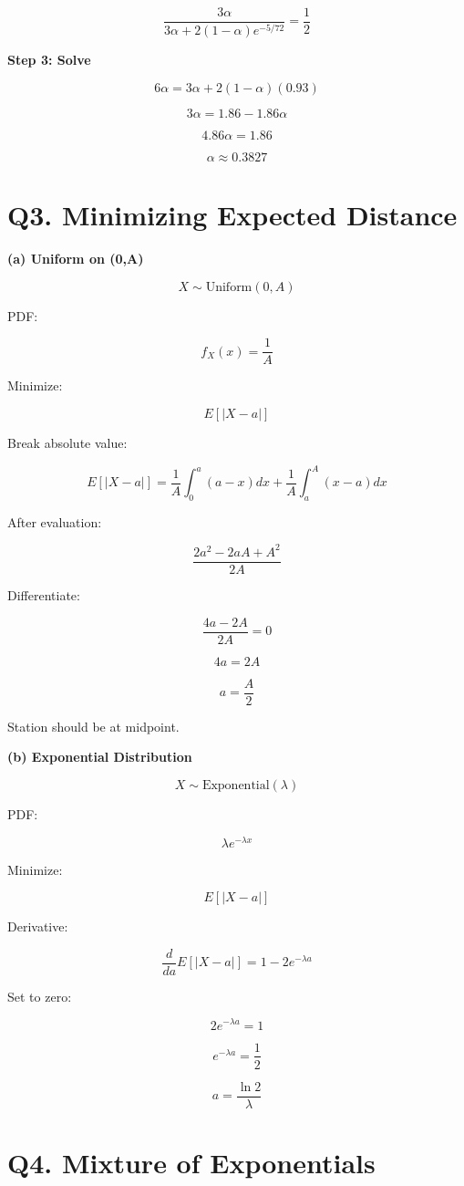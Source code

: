 \documentclass[11pt]{article}
\begin{document}
\[
\frac{3\alpha}{3\alpha+2(1-\alpha)e^{-5/72}}=\frac{1}{2}
\]

\textbf{Step 3: Solve}

\[
6\alpha = 3\alpha + 2(1-\alpha)(0.93)
\]

\[
3\alpha = 1.86 - 1.86\alpha
\]

\[
4.86\alpha = 1.86
\]

\[
\alpha \approx 0.3827
\]


\section*{Q3. Minimizing Expected Distance}

\textbf{(a) Uniform on (0,A)}

\[
X \sim \text{Uniform}(0,A)
\]

PDF:

\[
f_X(x)=\frac{1}{A}
\]

Minimize:

\[
E[|X-a|]
\]

Break absolute value:

\[
E[|X-a|]=\frac{1}{A}\int_0^a(a-x)dx+\frac{1}{A}\int_a^A(x-a)dx
\]

After evaluation:

\[
\frac{2a^2-2aA+A^2}{2A}
\]

Differentiate:

\[
\frac{4a-2A}{2A}=0
\]

\[
4a=2A
\]

\[
a=\frac{A}{2}
\]

Station should be at midpoint.

\textbf{(b) Exponential Distribution}

\[
X \sim \text{Exponential}(\lambda)
\]

PDF:

\[
\lambda e^{-\lambda x}
\]

Minimize:

\[
E[|X-a|]
\]

Derivative:

\[
\frac{d}{da}E[|X-a|]=1-2e^{-\lambda a}
\]

Set to zero:

\[
2e^{-\lambda a}=1
\]

\[
e^{-\lambda a}=\frac{1}{2}
\]

\[
a=\frac{\ln 2}{\lambda}
\]

\section*{Q4. Mixture of Exponentials}
\end{document}
